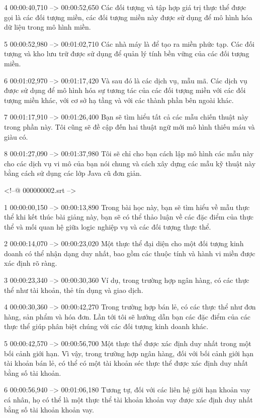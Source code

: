 4
00:00:40,710 --> 00:00:52,650
Các đối tượng và tập hợp giá trị thực thể được gọi là các đối tượng miền, các đối tượng miền này được sử dụng để mô hình hóa dữ liệu trong mô hình miền.

5
00:00:52,980 --> 00:01:02,710
Các nhà máy là để tạo ra miền phức tạp.  Các đối tượng và kho lưu trữ được sử dụng để quản lý tính bền vững của các đối tượng miền.

6
00:01:02,970 --> 00:01:17,420
Và sau đó là các dịch vụ, mẫu mã.  Các dịch vụ được sử dụng để mô hình hóa sự tương tác của các đối tượng miền với các đối tượng miền khác, với cơ sở hạ tầng và với các thành phần bên ngoài khác.

7
00:01:17,910 --> 00:01:26,400
Bạn sẽ tìm hiểu tất cả các mẫu chiến thuật này trong phần này.  Tôi cũng sẽ đề cập đến hai thuật ngữ mới mô hình thiếu máu và giàu có.

8
00:01:27,090 --> 00:01:37,980
Tôi sẽ chỉ cho bạn cách lập mô hình các mẫu này cho các dịch vụ vi mô của bạn nói chung và cách xây dựng các mẫu kỹ thuật này bằng cách sử dụng các lớp Java cũ đơn giản.

<!--@ 000000002.srt -->

1
00:00:00,150 --> 00:00:13,890
Trong bài học này, bạn sẽ tìm hiểu về mẫu thực thể khi kết thúc bài giảng này, bạn sẽ có thể thảo luận về các đặc điểm của thực thể và mối quan hệ giữa logic nghiệp vụ và các đối tượng thực thể.

2
00:00:14,070 --> 00:00:23,020
Một thực thể đại diện cho một đối tượng kinh doanh có thể nhận dạng duy nhất, bao gồm các thuộc tính và hành vi miền được xác định rõ ràng.

3
00:00:23,340 --> 00:00:30,360
Ví dụ, trong trường hợp ngân hàng, có các thực thể như tài khoản, thẻ tín dụng và giao dịch.

4
00:00:30,360 --> 00:00:42,270
Trong trường hợp bán lẻ, có các thực thể như đơn hàng, sản phẩm và hóa đơn.  Lần tới tôi sẽ hướng dẫn bạn các đặc điểm của các thực thể giúp phân biệt chúng với các đối tượng kinh doanh khác.

5
00:00:42,570 --> 00:00:56,700
Một thực thể được xác định duy nhất trong một bối cảnh giới hạn.  Vì vậy, trong trường hợp ngân hàng, đối với bối cảnh giới hạn tài khoản bán lẻ, có thể có một tài khoản séc thực thể được xác định duy nhất bằng số tài khoản.

6
00:00:56,940 --> 00:01:06,180
Tương tự, đối với các liên hệ giới hạn khoản vay cá nhân, họ có thể là một thực thể tài khoản khoản vay được xác định duy nhất bằng số tài khoản khoản vay.

